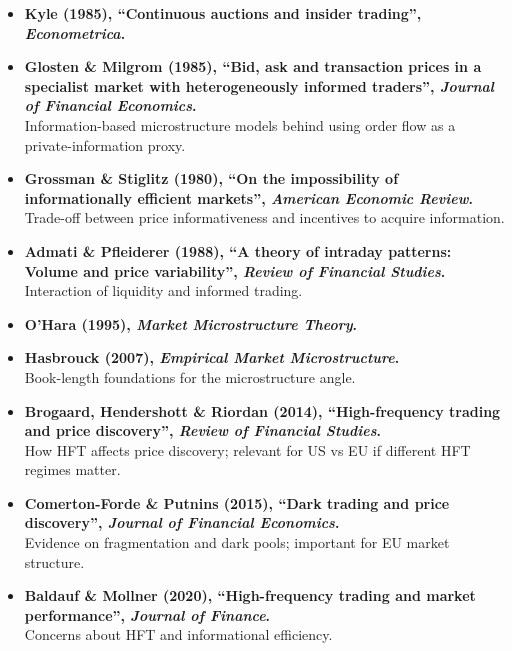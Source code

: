 \documentclass[11pt,a4paper]{article}
\begin{document}
\begin{itemize}
  \item \textbf{Kyle (1985), ``Continuous auctions and insider trading'', \emph{Econometrica}.}
  \item \textbf{Glosten \& Milgrom (1985), ``Bid, ask and transaction prices in a specialist market with heterogeneously informed traders'', \emph{Journal of Financial Economics}.}\\
  Information-based microstructure models behind using order flow as a private-information proxy.

  \item \textbf{Grossman \& Stiglitz (1980), ``On the impossibility of informationally efficient markets'', \emph{American Economic Review}.}\\
  Trade-off between price informativeness and incentives to acquire information.

  \item \textbf{Admati \& Pfleiderer (1988), ``A theory of intraday patterns: Volume and price variability'', \emph{Review of Financial Studies}.}\\
  Interaction of liquidity and informed trading.

  \item \textbf{O'Hara (1995), \emph{Market Microstructure Theory}.}
  \item \textbf{Hasbrouck (2007), \emph{Empirical Market Microstructure}.}\\
  Book-length foundations for the microstructure angle.

  \item \textbf{Brogaard, Hendershott \& Riordan (2014), ``High-frequency trading and price discovery'', \emph{Review of Financial Studies}.}\\
  How HFT affects price discovery; relevant for US vs EU if different HFT regimes matter.

  \item \textbf{Comerton-Forde \& Putnins (2015), ``Dark trading and price discovery'', \emph{Journal of Financial Economics}.}\\
  Evidence on fragmentation and dark pools; important for EU market structure.

  \item \textbf{Baldauf \& Mollner (2020), ``High-frequency trading and market performance'', \emph{Journal of Finance}.}\\
  Concerns about HFT and informational efficiency.
\end{itemize}
\end{document}
